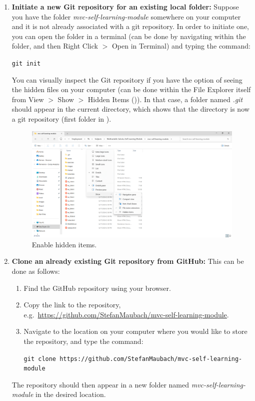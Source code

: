 \documentclass[a4paper,10pt]{article}
\begin{document}
\begin{enumerate}
    \item \textbf{Initiate a new Git repository for an existing local folder:} Suppose you have the folder \emph{mvc-self-learning-module} somewhere on your computer and it is not already associated with a git repository. In order to initiate one, you can open the folder in a terminal (can be done by navigating within the folder, and then Right Click $>$ Open in Terminal) and typing the command: 

    \texttt{git init}

    You can visually inspect the Git repository if you have the option of seeing the hidden files on your computer (can be done within the File Explorer itself from View $>$ Show $>$ Hidden Items ()). In that case, a folder named \emph{.git} should appear in the current directory, which shows that the directory is now a git repository (first folder in ).

    \begin{figure}[htbp]
        \includegraphics[width=\textwidth]{hidden_items.png}
        \caption{Enable hidden items.}
        \label{hidden_items}   
    \end{figure}

    \item \textbf{Clone an already existing Git repository from GitHub:} This can be done as follows:
    \begin{enumerate}
        \item Find the GitHub repository using your browser.
        \item Copy the link to the repository, e.g.\ \url{https://github.com/StefanMaubach/mvc-self-learning-module}.
        \item Navigate to the location on your computer where you would like to store the repository, and type the command:
        
        \texttt{git clone https://github.com/StefanMaubach/mvc-self-learning-module}
    \end{enumerate}
    The repository should then appear in a new folder named \emph{mvc-self-learning-module} in the desired location.
\end{enumerate}
\end{document}
